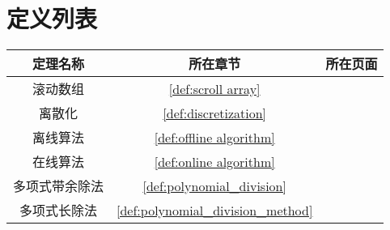 \chapter{定义列表}

\begin{table}[H]
    \centering
    \begin{tabular}{ccc}
        \toprule
        定理名称       & 所在章节                             & 所在页面                                 \\
        \midrule
        滚动数组       & \ref{def:scroll array}               & \pageref{def:scroll array}               \\
        离散化         & \ref{def:discretization}             & \pageref{def:discretization}             \\
        离线算法       & \ref{def:offline algorithm}          & \pageref{def:offline algorithm}          \\
        在线算法       & \ref{def:online algorithm}           & \pageref{def:online algorithm}           \\
        多项式带余除法 & \ref{def:polynomial_division}        & \pageref{def:polynomial_division}        \\
        多项式长除法   & \ref{def:polynomial_division_method} & \pageref{def:polynomial_division_method} \\
        \bottomrule
    \end{tabular}
\end{table}